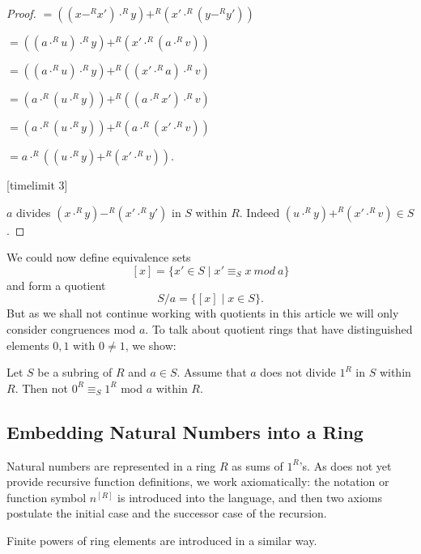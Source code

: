 \documentclass[english,11pt]{article}
\begin{document}
\begin{forthel}
\begin{proof}
$ = ((x -^{R} x') \cdot^{R} y) +^{R} (x' \cdot^{R} (y -^{R} y'))$

$ = ((a \cdot^{R} u) \cdot^{R} y) +^{R} (x' \cdot^{R} (a \cdot^{R} v))$

$ = ((a \cdot^{R} u) \cdot^{R} y) +^{R} ((x' \cdot^{R} a) \cdot^{R} v)$

$ = (a \cdot^{R} (u \cdot^{R} y)) +^{R} ((a \cdot^{R} x') \cdot^{R} v)$

$ = (a \cdot^{R} (u \cdot^{R} y)) +^{R} (a \cdot^{R} (x' \cdot^{R} v))$

$ = a \cdot^{R} ((u \cdot^{R} y) +^{R} (x' \cdot^{R} v))$.

[timelimit 3]

$a$ divides $(x \cdot^{R} y) -^{R} (x' \cdot^{R} y')$
in $S$ within $R$. Indeed
$(u \cdot^{R} y) +^{R} (x' \cdot^{R} v) \in S$.
\end{proof}

\end{forthel}
We could now define equivalence sets 
%
$$[x]=\{x' \in S \mid x' \equiv_{S} x \ mod \ a\}$$
%
and form a quotient
%
$$ S/a = \{[x]\mid x \in S\}.$$
%
But as we shall not continue working with quotients in this article
we will only consider congruences mod $a$. To talk about 
quotient rings that have distinguished elements $0,1$ with 
$0 \neq 1$, we show:
\begin{forthel}
\begin{lemma}
Let $S$ be a subring of $R$ and $a \in S$.
Assume that $a$ does not divide $1^{R}$ in $S$ within $R$.
Then not $0^{R} \equiv_{S} 1^{R}$ mod $a$ within $R$.
\end{lemma}


\end{forthel}

\subsection{Embedding Natural Numbers into a Ring}

Natural numbers are represented in a ring $R$ as sums of $1^{R}$'s.
As \Naproche{} does not yet provide recursive function definitions,
we work axiomatically: the notation or function symbol $n^{[R]}$ is
introduced into the language, and then two axioms postulate the initial case
and the successor case of the recursion.

Finite powers of ring elements are introduced in a similar way.
\end{document}
